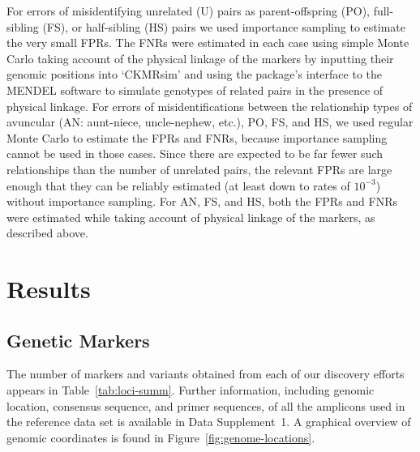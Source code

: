 For errors of misidentifying
unrelated (U) pairs as parent-offspring (PO), full-sibling (FS), or half-sibling (HS)
pairs we used importance sampling to estimate the very small FPRs.  The
FNRs were estimated in each case using simple Monte Carlo taking account
of the physical linkage of the markers by inputting their genomic positions into
`CKMRsim' and using the package's interface to the MENDEL \citep{lange2013mendel}
software to simulate genotypes of related pairs
in the presence of physical linkage.  
For errors of misidentifications between the relationship
types of avuncular (AN: aunt-niece, uncle-nephew, etc.), PO, FS, and HS,
we used regular Monte Carlo to estimate the FPRs and FNRs, because
importance sampling cannot be used in those cases. Since there are
expected to be far fewer such relationships than the number of unrelated
pairs, the relevant FPRs are large enough that they can be reliably estimated
(at least down to rates of $10^{-3}$) without importance sampling.
For AN, FS, and HS, both the
FPRs and FNRs were estimated while taking account of physical linkage
of the markers, as described above.

\section*{Results}

\subsection*{Genetic Markers}

The number of markers and variants obtained from each of our discovery efforts appears in
Table~\ref{tab:loci-summ}.  Further information, including genomic location, consensus sequence, and primer sequences,
of all the amplicons used in the reference data set is available
in Data Supplement~1.  A graphical overview of genomic coordinates is found in Figure~\ref{fig:genome-locations}.


